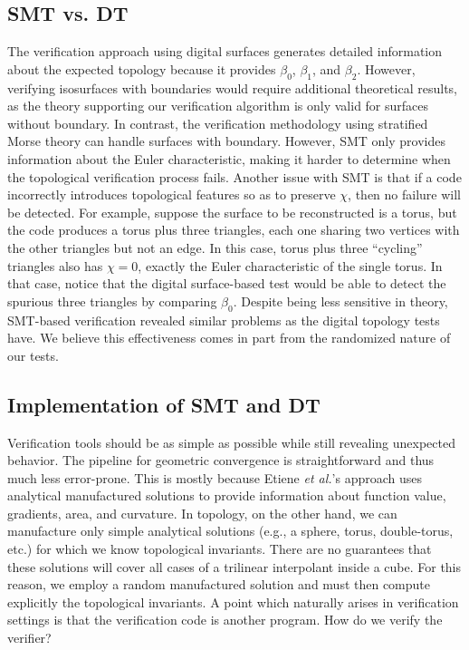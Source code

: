 \subsection{SMT vs. DT}
The verification approach using digital surfaces generates detailed
information about the expected topology because it provides $\beta_0$, $\beta_1$, and $\beta_2$. 
However, verifying isosurfaces with boundaries would require
additional theoretical results, as the theory supporting our verification
algorithm is only valid for surfaces without boundary.
In contrast, the verification methodology using stratified Morse theory can handle
surfaces with boundary. However, SMT only provides information 
about the Euler characteristic, making it harder to determine when the topological verification process fails.
Another issue with SMT is that if a code incorrectly introduces topological features so as
to preserve $\chi$, then no failure will be detected. For example, suppose the surface to
be reconstructed is a torus, but the code produces a torus plus three triangles,
each one sharing two vertices with the other triangles but not an edge. In this case, 
torus plus three ``cycling'' triangles also has $\chi = 0$, exactly the Euler characteristic of the single torus.
In that case, notice that the digital surface-based test would be able to
detect the spurious three triangles by comparing $\beta_0$.
Despite being less sensitive in theory, 
SMT-based verification revealed similar problems as the digital topology tests have. 
We believe this effectiveness comes in part from 
the randomized nature of our tests.

\subsection{Implementation of SMT and DT}
Verification tools should be as simple as possible while still
revealing unexpected behavior. The pipeline for geometric
convergence is straightforward and thus much less error-prone. This is
mostly because
Etiene \emph{et al.}'s approach uses analytical manufactured solutions to provide
information about function value, gradients, area, and curvature. In topology,
on the other hand, we can manufacture only simple analytical solutions (e.g., a
sphere, torus, double-torus, etc.) for which we know topological
invariants. There are no guarantees that these solutions will cover all
cases of a trilinear interpolant inside a cube. For this reason, we
employ a random manufactured solution and must then compute
explicitly the topological invariants.
A point which naturally arises in verification settings is that the verification code is another program. 
How do we verify the verifier?

